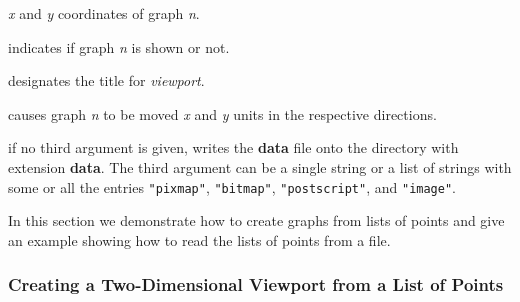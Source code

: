 \begin{description}
{\it x} and {\it y} coordinates of graph {\it n}.
%
\item[\spadfun{show}]
indicates if graph {\it n} is shown or not.
%
\item[\spadfun{title}]
designates the title for {\it viewport}.
%
\item[\spadfun{translate}]
causes graph {\it n} to be moved {\it x} and {\it y} units in the respective directions.
%
\item[\spadfun{write}]
if no third argument is given, writes the {\bf data} file onto the directory
with extension {\bf data}.
The third argument can be a single string or a list of strings with some or
all the entries {\tt "pixmap"}, {\tt "bitmap"}, {\tt "postscript"}, and
{\tt "image"}.
\end{description}
\egroup


In this section we demonstrate how to create \twodim{} graphs from
lists of points and give an example showing how to read the lists
of points from a file.

\subsubsection{Creating a Two-Dimensional Viewport from a List of Points}

